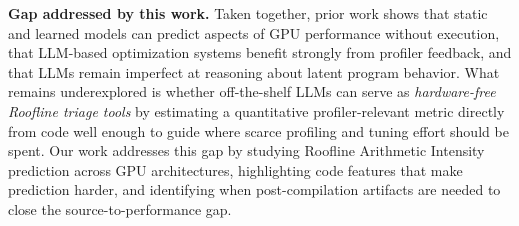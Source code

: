 \textbf{Gap addressed by this work.}
Taken together, prior work shows that static and learned models can predict aspects of GPU performance without execution, that LLM-based optimization systems benefit strongly from profiler feedback, and that LLMs remain imperfect at reasoning about latent program behavior.
What remains underexplored is whether off-the-shelf LLMs can serve as \emph{hardware-free Roofline triage tools} by estimating a quantitative profiler-relevant metric directly from code well enough to guide where scarce profiling and tuning effort should be spent.
Our work addresses this gap by studying Roofline Arithmetic Intensity prediction across GPU architectures, highlighting code features that make prediction harder, and identifying when post-compilation artifacts are needed to close the source-to-performance gap.

